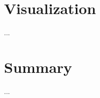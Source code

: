 \documentclass[12pt,journal,compsoc]{IEEEtran}
\begin{document}
\section{Visualization}
...

\section{Summary}
...




\nocite{*}
\printbibliography
\end{document}

